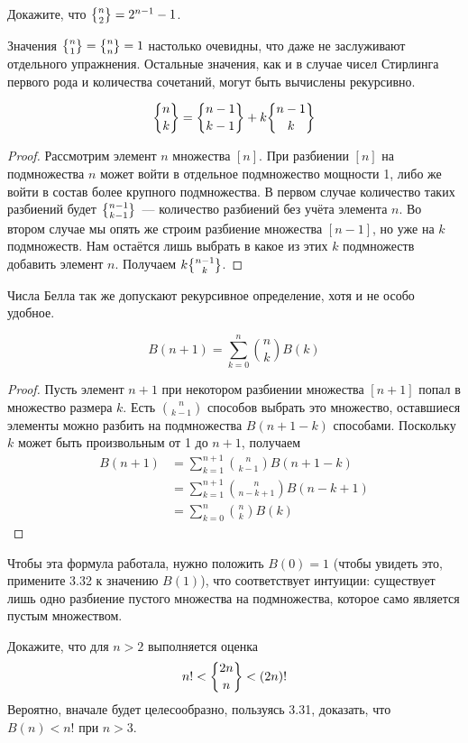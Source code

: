 \begin{exercise}
Докажите, что $\sstirling{n}{2} = 2^{n-1} - 1$.
\end{exercise}

Значения $\sstirling{n}{1} = \sstirling{n}{n} = 1$ настолько очевидны, что даже не заслуживают отдельного упражнения. Остальные значения, как и в случае чисел Стирлинга первого рода и количества сочетаний, могут быть вычислены рекурсивно.

\begin{thm}
$$\sstirling{n}{k} = \sstirling{n-1}{k-1} + k\sstirling{n-1}{k}$$
\end{thm}
\begin{proof}
Рассмотрим элемент $n$ множества $[n]$. При разбиении $[n]$ на подмножества $n$ может войти в отдельное подмножество мощности 1, либо же войти в состав более крупного подмножества. В первом случае количество таких разбиений будет $\sstirling{n-1}{k-1}$~--- количество разбиений без учёта элемента $n$. Во втором случае мы опять же строим разбиение множества $[n-1]$, но уже на $k$ подмножеств. Нам остаётся лишь выбрать в какое из этих $k$ подмножеств добавить элемент $n$. Получаем $k\sstirling{n-1}{k}$.
\end{proof}

Числа Белла так же допускают рекурсивное определение, хотя и не особо удобное.

\begin{thm}
$$B(n+1) = \sum_{k=0}^n{n \choose k} B(k)$$
\end{thm}
\begin{proof}
Пусть элемент $n+1$ при некотором разбиении множества $[n+1]$ попал в множество размера $k$. Есть $n\choose k - 1$ способов выбрать это множество, оставшиеся элементы можно разбить на подмножества $B(n+1-k)$ способами. Поскольку $k$ может быть произвольным от 1 до $n+1$, получаем
\begin{align*}
B(n+1) & = \sum_{k=1}^{n+1}{n\choose k-1}B(n+1-k)\\
& = \sum_{k=1}^{n+1}{n\choose n-k+1}B(n-k+1) \\
& = \sum_{k=0}^{n}{n\choose k}B(k)
\end{align*}
\end{proof}

Чтобы эта формула работала, нужно положить $B(0) = 1$ (чтобы увидеть это, примените 3.32 к значению $B(1)$), что соответствует интуиции: существует лишь одно разбиение пустого множества на подмножества, которое само является пустым множеством.

\begin{exercise}
Докажите, что для $n>2$ выполняется оценка
$$n! < \sstirling{2n}{n} < (2n)!$$
Вероятно, вначале будет целесообразно, пользуясь 3.31, доказать, что $B(n) < n!$ при $n>3$.
\end{exercise}
